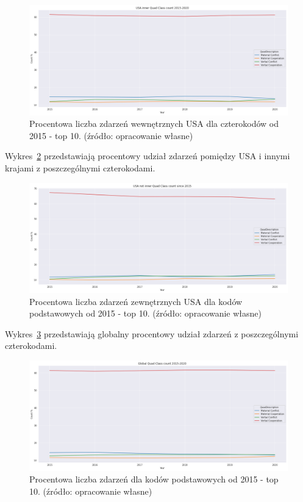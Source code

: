\documentclass[11pt]{report}
\begin{document}
    \begin{figure}[!htp]
        \centering
        \includegraphics[width=\linewidth]{fig/USA inner/QCperc.png}
        \caption{Procentowa liczba zdarzeń wewnętrznych USA dla czterokodów od 2015 - top 10. (źródło: opracowanie własne)}
        \label{fig:USA_inner_QCperc}
    \end{figure}

    Wykres~\ref{fig:USA_not_inner_QCperc} przedstawiają procentowy udział zdarzeń pomiędzy USA i innymi krajami z poszczególnymi czterokodami.

    \begin{figure}[!htp]
        \centering
        \includegraphics[width=\linewidth]{fig/USA not inner/QCperc.png}
        \caption{Procentowa liczba zdarzeń zewnętrznych USA dla kodów podstawowych od 2015 - top 10. (źródło: opracowanie własne)}
        \label{fig:USA_not_inner_QCperc}
    \end{figure}

    Wykres~\ref{fig:GLOBAL_QCperc} przedstawiają globalny procentowy udział zdarzeń z poszczególnymi czterokodami.

    \begin{figure}[!htp]
        \centering
        \includegraphics[width=\linewidth]{fig/GLOBAL/QCperc.png}
        \caption{Procentowa liczba zdarzeń dla kodów podstawowych od 2015 - top 10. (źródło: opracowanie własne)}
        \label{fig:GLOBAL_QCperc}
    \end{figure}
\end{document}
